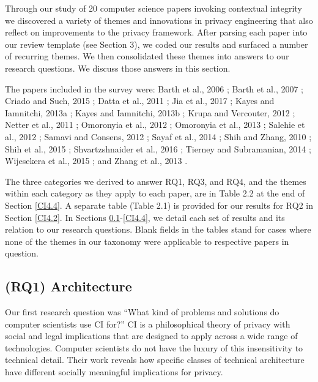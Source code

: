 \documentclass[../thesis.tex]{subfiles}
\begin{document}
Through our study of 20 computer science papers invoking contextual
integrity we discovered a variety of themes and innovations in privacy
engineering that also reflect on improvements to the privacy framework.
After parsing each paper into our review template (see Section 3), we
coded our results and surfaced a number of recurring themes. We then
consolidated these themes into answers to our research questions. We
discuss those answers in this section.

The papers included in the survey were:
Barth et al., 2006 \cite{barth06sp};
Barth et al., 2007 \cite{barth07csf};
Criado and Such, 2015 \cite{criado2015implicit};
Datta et al., 2011 \cite{datta2011understanding};
Jia et al., 2017 \cite{jia2017contexiot};
Kayes and Iamnitchi, 2013a \cite{kayes2013aegis};
Kayes and Iamnitchi, 2013b \cite{kayes2013out};
Krupa and Vercouter, 2012 \cite{krupa2012handling};
Netter et al., 2011 \cite{netter2011assisted};
Omoronyia et al., 2012 \cite{omoronyia2012caprice};
Omoronyia et al., 2013 \cite{omoronyia2013engineering};
Salehie et al., 2012 \cite{salehie2012adaptive};
Samavi and Consens, 2012 \cite{samavi2012l2tap+};
Sayaf et al., 2014 \cite{sayaf2014mathrm};
Shih and Zhang, 2010 \cite{shih2010towards};
Shih et al., 2015 \cite{shih2015privacy};
Shvartzshnaider et al., 2016 \cite{shvartzshnaider2016learning};
Tierney and Subramanian, 2014 \cite{tierney2014realizing};
Wijesekera et al., 2015 \cite{wijesekera2015android};
and Zhang et al., 2013 \cite{zhang2013no}.

The three categories we derived to
answer RQ1, RQ3, and RQ4, and the themes within each category as they
apply to each paper, are in Table 2.2 at the end of Section \ref{CI4.4}. A
separate table (Table 2.1) is provided for our results for RQ2 in Section
\ref{CI4.2}. In Sections \ref{CI4.1}-\ref{CI4.4}, we detail each
set of results and its
relation to our research questions. Blank fields in the tables stand
for cases where none of the themes in our taxonomy were applicable to
respective papers in question.

\subsection{(RQ1) Architecture}
\label{CI4.1}

Our first research question was
``What kind of problems and solutions do computer
scientists use CI for?'' CI is a philosophical theory
of privacy with social and legal implications that are designed to
apply across a wide range of technologies. Computer scientists do not
have the luxury of this insensitivity to technical detail. Their work
reveals how specific classes of technical architecture have different
socially meaningful implications for privacy.
\end{document}
